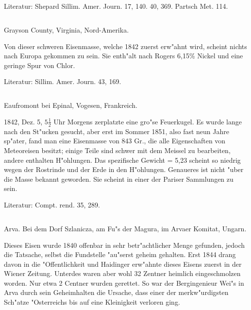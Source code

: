 \documentclass[a4paper, 11pt, oneside]{article}
\begin{document}
\normalsize
Literatur: Shepard Sillim. Amer. Journ. 17, 140. 40, 369. Partsch Met. 114.

\subsection{}
\LARGE
\paragraph{}
Grayson County, Virginia, Nord-Amerika.

Von dieser schweren Eisenmasse, welche 1842 zuerst erw"ahnt wird, scheint nichts nach Europa gekommen zu sein. Sie enth"alt nach Rogers 6,15\% Nickel und eine geringe Spur von Chlor.

\normalsize
Literatur: Sillim. Amer. Journ. 43, 169.

\subsection{}
\LARGE
\paragraph{}
Eaufromont bei Epinal, Vogesen, Frankreich.

1842, Dez. 5, $\mathfrak{5\frac{1}{2}}$ Uhr Morgens zerplatzte eine gro"se Feuerkugel. Es wurde lange nach den St"ucken gesucht, aber erst im Sommer 1851, also fast neun Jahre sp"ater, fand man eine Eisenmasse von 843 Gr., die alle Eigenschaften von Meteoreisen besitzt; einige Teile sind schwer mit dem Meissel zu bearbeiten, andere enthalten H"ohlungen. Das spezifische Gewicht = 5,23 scheint so niedrig wegen der Rostrinde und der Erde in den H"ohlungen. Genaueres ist nicht "uber die Masse bekannt geworden. Sie scheint in einer der Pariser Sammlungen zu sein.

\normalsize
Literatur: Compt. rend. 35, 289.

\subsection{}
\LARGE
\paragraph{}
Arva. Bei dem Dorf Szlanicza, am Fu"s der Magura, im Arvaer Komitat, Ungarn.

Dieses Eisen wurde 1840 offenbar in sehr betr"achtlicher Menge gefunden, jedoch die Tatsache, selbst die Fundstelle "au"serst geheim gehalten. Erst 1844 drang davon in die "Offentlichkeit und Haidinger erw"ahnte dieses Eisens zuerst in der Wiener Zeitung. Unterdes waren aber wohl 32 Zentner heimlich eingeschmolzen worden. Nur etwa 2 Centner wurden gerettet. So war der Bergingenieur Wei"s in Arva durch sein Geheimhalten die Ursache, dass einer der merkw"urdigsten Sch"atze "Osterreichs bis auf eine Kleinigkeit verloren ging.
\end{document}
